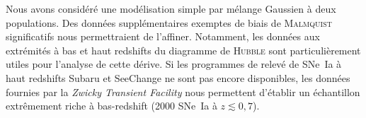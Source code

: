 \documentclass[../main/main.tex]{subfiles}
\begin{document}
Nous avons considéré une modélisation simple par mélange Gaussien à deux
populations. Des données supplémentaires exemptes de biais de \textsc{Malmquist}
significatifs nous permettraient de l'affiner. Notamment, les données aux
extrémités à bas et haut redshifts du diagramme de \textsc{Hubble} sont
particulièrement utiles pour l'analyse de cette dérive. Si les programmes de
relevé de SNe~Ia à haut redshifts Subaru et SeeChange ne sont pas encore
disponibles, les données fournies par la \textit{Zwicky Transient Facility}
\citep[ZTF,][]{bellm2019, graham2019} nous permettent d'établir un échantillon
extrêmement riche à bas-redshift (2000 SNe~Ia à $z \lesssim 0,7$).

\newpage

\minilof
\minilot

% 
% 
\end{document}
